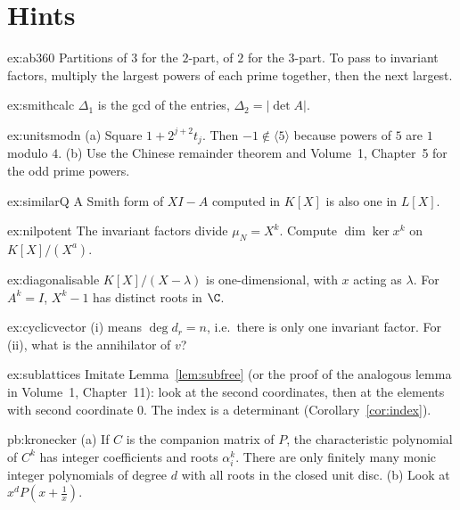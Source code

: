 \section{Hints}

\begin{hint}{ex:ab360}
Partitions of $3$ for the $2$-part, of $2$ for the $3$-part. To pass to invariant factors, multiply the largest powers of each prime together, then the next largest.
\end{hint}
\begin{hint}{ex:smithcalc}
$\Delta_1$ is the gcd of the entries, $\Delta_2=|\det A|$.
\end{hint}
\begin{hint}{ex:unitsmodn}
(a) Square $1+2^{j+2}t_j$. Then $-1\notin\langle5\rangle$ because powers of $5$ are $1$ modulo $4$. (b) Use the Chinese remainder theorem and Volume~1, Chapter~5 for the odd prime powers.
\end{hint}
\begin{hint}{ex:similarQ}
A Smith form of $XI-A$ computed in $K[X]$ is also one in $L[X]$.
\end{hint}
\begin{hint}{ex:nilpotent}
The invariant factors divide $\mu_N=X^k$. Compute $\dim\ker x^k$ on $K[X]/(X^a)$.
\end{hint}
\begin{hint}{ex:diagonalisable}
$K[X]/(X-\lambda)$ is one-dimensional, with $x$ acting as $\lambda$. For $A^k=I$, $X^k-1$ has distinct roots in $\C$.
\end{hint}
\begin{hint}{ex:cyclicvector}
(i) means $\deg d_r=n$, i.e.\ there is only one invariant factor. For (ii), what is the annihilator of $v$?
\end{hint}
\begin{hint}{ex:sublattices}
Imitate Lemma~\ref{lem:subfree} (or the proof of the analogous lemma in Volume~1, Chapter~11): look at the second coordinates, then at the elements with second coordinate $0$. The index is a determinant (Corollary~\ref{cor:index}).
\end{hint}

\begin{hint}{pb:kronecker}
(a) If $C$ is the companion matrix of $P$, the characteristic polynomial of $C^k$ has integer coefficients and roots
$\alpha_i^k$. There are only finitely many monic integer polynomials of degree $d$ with all roots in the closed unit disc.
(b) Look at $x^dP(x+\frac1x)$.
\end{hint}

